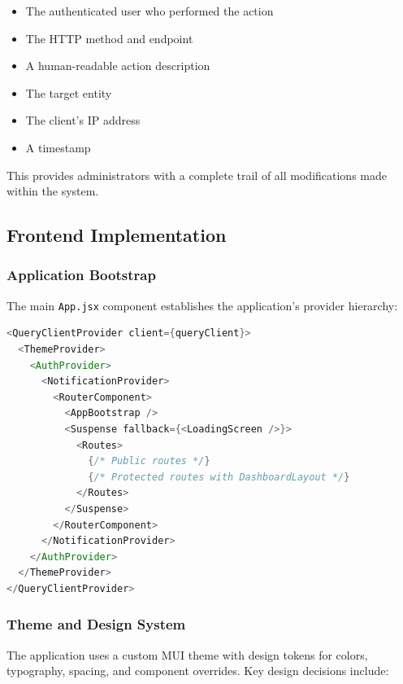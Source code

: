 \begin{itemize}[leftmargin=2em]
    \item The authenticated user who performed the action
    \item The HTTP method and endpoint
    \item A human-readable action description
    \item The target entity
    \item The client's IP address
    \item A timestamp
\end{itemize}

This provides administrators with a complete trail of all modifications made within the system.

\subsection{Frontend Implementation}

\subsubsection{Application Bootstrap}

The main \texttt{App.jsx} component establishes the application's provider hierarchy:

\begin{lstlisting}[language=Java, caption={Application Provider Hierarchy (App.jsx)}]
<QueryClientProvider client={queryClient}>
  <ThemeProvider>
    <AuthProvider>
      <NotificationProvider>
        <RouterComponent>
          <AppBootstrap />
          <Suspense fallback={<LoadingScreen />}>
            <Routes>
              {/* Public routes */}
              {/* Protected routes with DashboardLayout */}
            </Routes>
          </Suspense>
        </RouterComponent>
      </NotificationProvider>
    </AuthProvider>
  </ThemeProvider>
</QueryClientProvider>
\end{lstlisting}

\subsubsection{Theme and Design System}

The application uses a custom MUI theme with design tokens for colors, typography, spacing, and component overrides. Key design decisions include:

